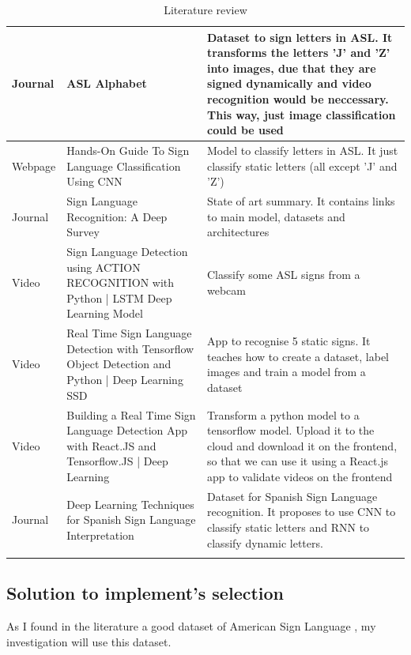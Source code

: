 \begin{longtable}{|p{3cm}|p{4cm}|p{6cm}|}
    \hline Journal & ASL Alphabet \cite{Akash2018} & Dataset to sign letters in ASL. It transforms the letters 'J' and 'Z' into images, due that they are signed dynamically and video recognition would be neccessary. This way, just image classification could be used \\
    \hline Webpage & Hands-On Guide To Sign Language Classification Using CNN \cite{SignLanguageClassification2020} & Model to classify letters in ASL. It just classify static letters (all except 'J' and 'Z') \\
    \hline Journal & Sign Language Recognition: A Deep Survey \cite{Rastgoo2021} & State of art summary. It contains links to main model, datasets and architectures \\
    \hline Video   & Sign Language Detection using ACTION RECOGNITION with Python | LSTM Deep Learning Model \cite{SignLanguageRecognitionUsingActionRecognition} & Classify some ASL signs from a webcam \\
    \hline Video   & Real Time Sign Language Detection with Tensorflow Object Detection and Python | Deep Learning SSD \cite{SignLanguageRecognitionUsingObjectDetection} & App to recognise 5 static signs. It teaches how to create a dataset, label images and train a model from a dataset \\
    \hline Video   & Building a Real Time Sign Language Detection App with React.JS and Tensorflow.JS | Deep Learning \cite{SignLanguageRecognitionUsingReactjsAndTensorflow} & Transform a python model to a tensorflow model. Upload it to the cloud and download it on the frontend, so that we can use it using a React.js app to validate videos on the frontend \\
    \hline Journal & Deep Learning Techniques for Spanish Sign Language Interpretation \cite{SpanishDataset2021} & Dataset for Spanish Sign Language recognition. It proposes to use CNN to classify static letters and RNN to classify dynamic letters. \\
    \hline
    \caption{Literature review}
    \label{table:introduction_literature_review}
\end{longtable}

\subsection{Solution to implement's selection}
As I found in the literature a good dataset of American Sign Language \cite{Li2019}, my investigation will use this dataset. \\

